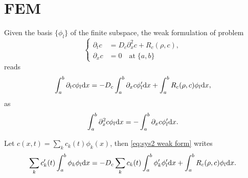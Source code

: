 \documentclass{article}
\begin{document}
  \section{FEM}
  Given the basis $\{\phi_l\}$ of the finite subspace, the weak formulation of problem
  \[
    \left\{
      \begin{aligned}
        \partial_t c &= D_c \partial_x^2 c + R_c(\rho, c), \\
        \partial_x c &= 0\quad\text{at}\;\{a,b\}
      \end{aligned}
    \right.
  \]
  reads
  \begin{equation}
    \label{eq:sys2 weak form}
    \int_a^b \partial_t c \phi_l\mathrm d x = - D_c\int_a^b \partial_x c\phi_l'\mathrm d x
                                          + \int_a^b R_c(\rho, c)\phi_l\mathrm d x,
  \end{equation}
  as
  \[
    \int_a^b \partial^2_x c\phi_l \mathrm d x = - \int_a^b \partial_x c\phi_l'\mathrm d x.
  \]

  Let $c(x, t) = \sum_k c_k(t)\phi_k(x)$, then \cref{eq:sys2 weak form} writes
  \[
    \sum_k c'_k(t)\int_a^b\phi_k\phi_l\mathrm d x = - D_c\sum_k c_k(t)\int_a^b\phi_k'\phi_l'\mathrm d x
                                                + \int_a^b R_c(\rho, c)\phi_l\mathrm d x.
  \]
\end{document}

